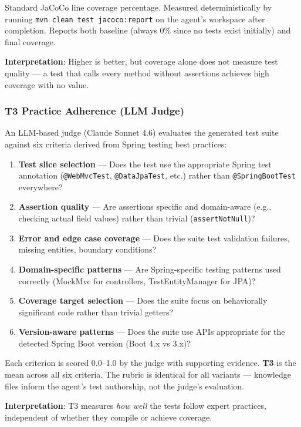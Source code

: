 \documentclass[11pt,a4paper]{article}
\begin{document}
Standard JaCoCo line coverage percentage. Measured deterministically by running
\texttt{mvn clean test jacoco:report} on the agent's workspace after completion.
Reports both baseline (always 0\% since no tests exist initially) and final coverage.

\textbf{Interpretation}: Higher is better, but coverage alone does not measure
test quality --- a test that calls every method without assertions achieves high
coverage with no value.

\subsubsection{T3 Practice Adherence (LLM Judge)}

An LLM-based judge (Claude Sonnet 4.6) evaluates the generated test suite against
six criteria derived from Spring testing best practices:

\begin{enumerate}
  \item \textbf{Test slice selection} --- Does the test use the appropriate Spring test annotation (\texttt{@WebMvcTest}, \texttt{@DataJpaTest}, etc.) rather than \texttt{@SpringBootTest} everywhere?
  \item \textbf{Assertion quality} --- Are assertions specific and domain-aware (e.g., checking actual field values) rather than trivial (\texttt{assertNotNull})?
  \item \textbf{Error and edge case coverage} --- Does the suite test validation failures, missing entities, boundary conditions?
  \item \textbf{Domain-specific patterns} --- Are Spring-specific testing patterns used correctly (MockMvc for controllers, TestEntityManager for JPA)?
  \item \textbf{Coverage target selection} --- Does the suite focus on behaviorally significant code rather than trivial getters?
  \item \textbf{Version-aware patterns} --- Does the suite use APIs appropriate for the detected Spring Boot version (Boot 4.x vs 3.x)?
\end{enumerate}

Each criterion is scored 0.0--1.0 by the judge with supporting evidence.
\textbf{T3} is the mean across all six criteria. The rubric is identical for
all variants --- knowledge files inform the agent's test authorship, not the
judge's evaluation.

\textbf{Interpretation}: T3 measures \emph{how well} the tests follow expert
practices, independent of whether they compile or achieve coverage.
\end{document}
